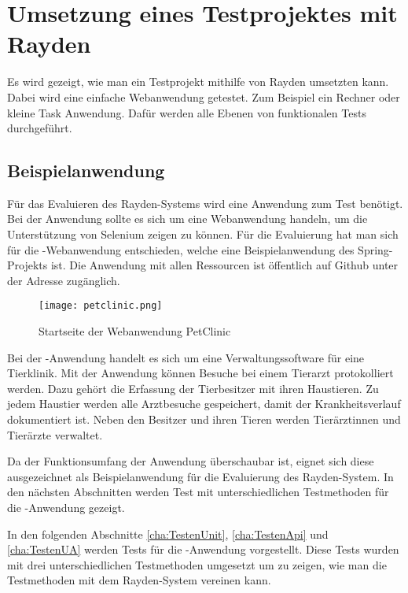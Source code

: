 \chapter{Umsetzung eines Testprojektes mit Rayden}
\label{cha:Testen}

Es wird gezeigt, wie man ein Testprojekt mithilfe von Rayden umsetzten kann. Dabei wird eine einfache Webanwendung getestet. Zum Beispiel ein Rechner oder kleine Task Anwendung. Dafür werden alle Ebenen von funktionalen Tests durchgeführt.


\section{Beispielanwendung}

Für das Evaluieren des Rayden-Systems wird eine Anwendung zum Test benötigt. Bei der Anwendung sollte es sich um eine Webanwendung handeln, um die Unterstützung von Selenium zeigen zu können. Für die Evaluierung hat man sich für die -Webanwendung entschieden, welche eine Beispielanwendung des Spring-Projekts ist. Die Anwendung mit allen Ressourcen ist öffentlich auf Github unter der Adresse  zugänglich.

\begin{figure}
\centering
\texttt{[image: petclinic.png]}
\caption{Startseite der Webanwendung PetClinic}
\label{fig:petClinicPage}
\end{figure}

\SuperPar
Bei der -Anwendung handelt es sich um eine Verwaltungssoftware für eine Tierklinik. Mit der Anwendung können Besuche bei einem Tierarzt protokolliert werden. Dazu gehört die Erfassung der Tierbesitzer mit ihren Haustieren. Zu jedem Haustier werden alle Arztbesuche gespeichert, damit der Krankheitsverlauf dokumentiert ist. Neben den Besitzer und ihren Tieren werden Tierärztinnen und Tierärzte verwaltet. 

\SuperPar
Da der Funktionsumfang der Anwendung überschaubar ist, eignet sich diese ausgezeichnet als Beispielanwendung für die Evaluierung des Rayden-System. In den nächsten Abschnitten werden Test mit unterschiedlichen Testmethoden für die -Anwendung gezeigt.

\SuperPar
In den folgenden Abschnitte \ref{cha:TestenUnit}, \ref{cha:TestenApi} und \ref{cha:TestenUA} werden Tests für die -Anwendung vorgestellt. Diese Tests wurden mit drei unterschiedlichen Testmethoden umgesetzt um zu zeigen, wie man die Testmethoden mit dem Rayden-System vereinen kann.

